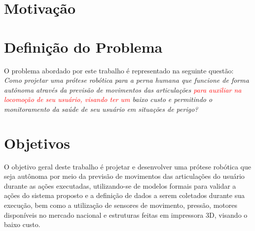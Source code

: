 
\section{Motivação}
\label{sec:motivacao}
\lipsum[6-8]

\section{Definição do Problema}
\lipsum[9-10]
O problema abordado por este trabalho é representado na seguinte questão: \textit{Como projetar uma prótese robótica para a perna humana que funcione de forma autônoma através da previsão de movimentos das articulações \textcolor{red}{para auxiliar na locomoção de seu usuário, visando ter um} baixo custo e permitindo o monitoramento da saúde de seu usuário em situações de perigo?}


\section{Objetivos}
\label{sec:objetivos}
O objetivo geral deste trabalho é projetar e desenvolver uma prótese robótica que seja autônoma por meio da previsão de movimentos das articulações do usuário durante as ações executadas, utilizando-se de modelos formais para validar a ações do sistema proposto e a definição de dados a serem coletados durante sua execução, bem como a utilização de sensores de movimento, pressão, motores disponíveis no mercado nacional e estruturas feitas em impressora 3D, visando o baixo custo.

